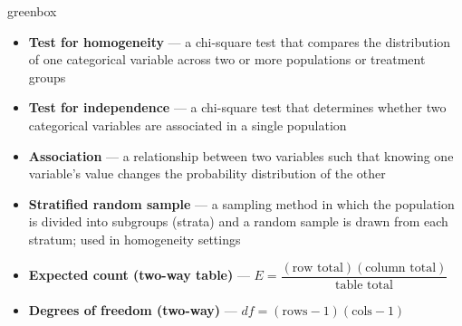 \documentclass[10pt]{article}
\begin{document}
\begin{skillbox}{greenbox}
\begin{minipage}[t]{0.48\linewidth}
    \begin{itemize}
        \item \textbf{Test for homogeneity} --- a chi-square test that compares the
              distribution of one categorical variable across two or more populations
              or treatment groups
        \item \textbf{Test for independence} --- a chi-square test that determines
              whether two categorical variables are associated in a single population
        \item \textbf{Association} --- a relationship between two variables such that
              knowing one variable's value changes the probability distribution of the other
    \end{itemize}
\end{minipage}
\hfill
\begin{minipage}[t]{0.48\linewidth}
    \begin{itemize}
        \item \textbf{Stratified random sample} --- a sampling method in which the
              population is divided into subgroups (strata) and a random sample is
              drawn from each stratum; used in homogeneity settings
        \item \textbf{Expected count (two-way table)} ---
              $E = \dfrac{(\text{row total})(\text{column total})}{\text{table total}}$
        \item \textbf{Degrees of freedom (two-way)} ---
              $df = (\text{rows} - 1)(\text{cols} - 1)$
    \end{itemize}
\end{minipage}
\end{skillbox}
\end{document}
